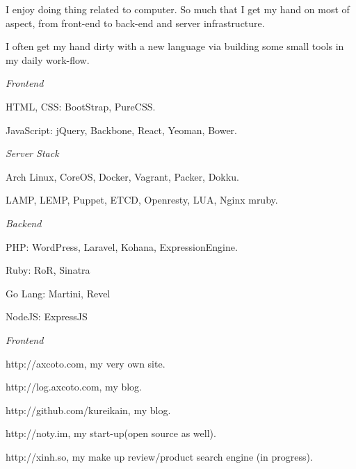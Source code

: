 \documentclass[11pt]{article}
\begin{document}
\medskip

\reversemarginpar

\medskip       

\medskip
{}

\noindent  I enjoy doing thing related to computer. So much that I get my hand on most of aspect, from front-end to back-end and server infrastructure.

\medskip I often get my hand dirty with a new language via building some small tools in my daily work-flow. 

\noindent  

\bigskip



\noindent\emph{Frontend \vspace{0.15in}}

\ind HTML, CSS: BootStrap, PureCSS. 

\ind JavaScript: jQuery, Backbone, React, Yeoman, Bower.

\noindent\emph{Server Stack \vspace{0.15in}}

\ind Arch Linux, CoreOS, Docker, Vagrant, Packer, Dokku.

\ind LAMP, LEMP, Puppet, ETCD, Openresty, LUA, Nginx mruby. 

\noindent\emph{Backend \vspace{0.15in}}

\ind PHP: WordPress, Laravel, Kohana, ExpressionEngine.

\ind Ruby: RoR, Sinatra

\ind Go Lang: Martini, Revel

\ind NodeJS: ExpressJS

\bigskip



\noindent\emph{Frontend \vspace{0.15in}}

\ind http://axcoto.com, my very own site.

\ind http://log.axcoto.com, my blog.

\ind http://github.com/kureikain, my blog.

\ind http://noty.im, my start-up(open source as well).

\ind http://xinh.so, my make up review/product search engine (in progress).
\end{document}
